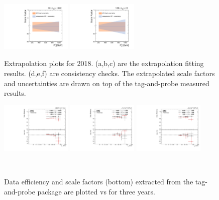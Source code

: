 \begin{figure}[!htbp]
  \includegraphics[width=0.3\textwidth]{fig/Extrapolate_2018_1_Compare.pdf}
  \includegraphics[width=0.3\textwidth]{fig/Extrapolate_2018_2_Compare.pdf}
  \caption{Extrapolation plots for 2018. (a,b,c) are the extrapolation fitting results. (d,e,f) are consistency checks. The extrapolated scale factors and uncertainties are drawn on top of the tag-and-probe measured results.}
  \label{fig:Extrapolation2018}
\end{figure}

\begin{figure}[tbp!]
\begin{center}
\includegraphics[angle=0,width=0.3\textwidth]{fig/eff2016.pdf}
\includegraphics[angle=0,width=0.3\textwidth]{fig/eff2017.pdf}
\includegraphics[angle=0,width=0.3\textwidth]{fig/eff2018.pdf}
\end{center}
\caption{Data efficiency and scale factors (bottom) extracted from the tag-and-probe package are plotted vs \pt for three years.}
~\label{fig:SFvsPt}
\end{figure}

